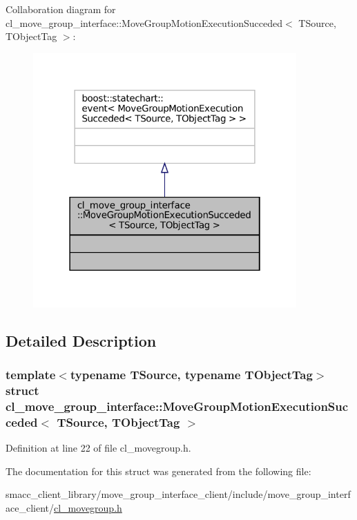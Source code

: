 Collaboration diagram for cl\+\_\+move\+\_\+group\+\_\+interface\+:\+:Move\+Group\+Motion\+Execution\+Succeded$<$ T\+Source, T\+Object\+Tag $>$\+:
\nopagebreak
\begin{figure}[H]
\begin{center}
\leavevmode
\includegraphics[width=286pt]{structcl__move__group__interface_1_1MoveGroupMotionExecutionSucceded__coll__graph}
\end{center}
\end{figure}


\subsection{Detailed Description}
\subsubsection*{template$<$typename T\+Source, typename T\+Object\+Tag$>$\newline
struct cl\+\_\+move\+\_\+group\+\_\+interface\+::\+Move\+Group\+Motion\+Execution\+Succeded$<$ T\+Source, T\+Object\+Tag $>$}



Definition at line 22 of file cl\+\_\+movegroup.\+h.



The documentation for this struct was generated from the following file\+:\begin{DoxyCompactItemize}
\item 
smacc\+\_\+client\+\_\+library/move\+\_\+group\+\_\+interface\+\_\+client/include/move\+\_\+group\+\_\+interface\+\_\+client/\hyperlink{cl__movegroup_8h}{cl\+\_\+movegroup.\+h}\end{DoxyCompactItemize}

